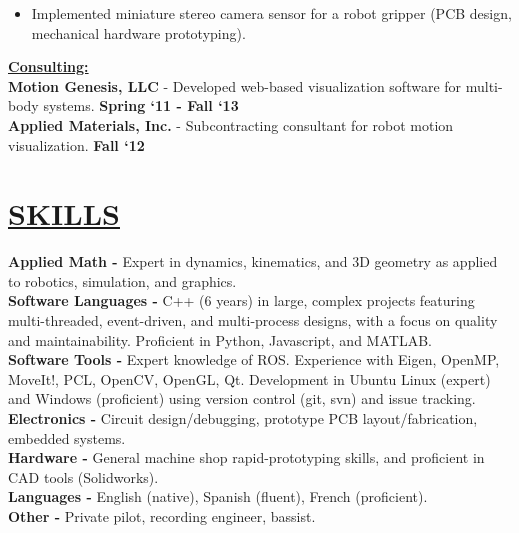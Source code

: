 \documentclass[line,margin]{res}
\newenvironment{compactlist}{
	\begin{itemize}\itemsep=0pt
}{
	\end{itemize}
}
\newcommand{\CVOnly}[1]{}
\newcommand{\CVOnly}[1]{#1}
\newcommand{\hide}[1]{}
\begin{document}
\begin{resume}
\begin{compactlist}
\item Implemented miniature stereo camera sensor for a robot gripper (PCB design, mechanical hardware prototyping).
\end{compactlist}
%
\CVOnly{
{\bf Electrical Engineering Intern} - Qual-Tron, Inc., Tulsa, OK \hfill \textbf{March `06 - Feb. `07}
\begin{compactlist}
\item Designed and implemented test procedures for IR and magnetic sensor products.
\item Led redesign of a magnetic sensor product to reduce cost and simplify assembly.
\end{compactlist}
}
%
\hide{
\\[0.4pc]{\bf Summer Intern} - Atmel Corporation \hfill \textbf{Summer `05}
\\[0.4pc]{\bf Summer Research Intern} - NASA Glenn Research Center \hfill \textbf{Summer `04}%
}
%
{\bf \underline{Consulting:}}
\\[0.2pc]{\bf Motion Genesis, LLC} - Developed web-based visualization software for multi-body systems. \hfill \textbf{Spring `11 - Fall `13}%
{\\[0.0pc]{\bf Applied Materials, Inc.} - Subcontracting consultant for robot motion visualization. \hfill \textbf{Fall `12}}%
\CVOnly{\\[0.0pc]{\bf Charm Labs} - Dynamics and control. Confidential. \hfill \textbf{Summer `12}}%
%
%
\section{\underline{SKILLS}}
\vspace{1.0pc}
\textbf{Applied Math -} Expert in dynamics, kinematics, and 3D geometry as applied to robotics, simulation, and graphics.
\\[0.0pc]\textbf{Software Languages -} C++ (6 years) in large, complex projects featuring multi-threaded, event-driven, and multi-process designs, with a focus on quality and maintainability. Proficient in Python, Javascript, and MATLAB.
\\[0.0pc]\textbf{Software Tools -}
Expert knowledge of ROS. Experience with Eigen, OpenMP, MoveIt!, PCL, OpenCV, OpenGL, Qt.
Development in Ubuntu Linux (expert) and Windows (proficient)
using version control (git, svn) and issue tracking.
\\[0.0pc]\textbf{Electronics -} Circuit design/debugging, prototype PCB layout/fabrication, embedded systems.
\\[0.0pc]\textbf{Hardware -} General machine shop rapid-prototyping skills, and proficient in CAD tools (Solidworks).
\\[0.0pc]\textbf{Languages -} English (native), Spanish (fluent), French (proficient).
\\[0.0pc]\textbf{Other -} Private pilot, recording engineer, bassist.
%
%

\end{resume}
\end{document}
